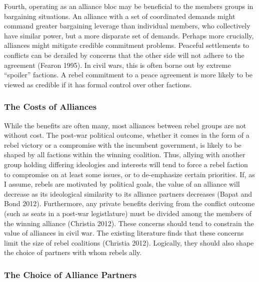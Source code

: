\documentclass[12pt,]{article}
\begin{document}
Fourth, operating as an alliance bloc may be beneficial to the members
groups in bargaining situations. An alliance with a set of coordinated
demands might command greater bargaining leverage than individual
members, who collectively have similar power, but a more disparate set
of demands. Perhaps more crucially, alliances might mitigate credible
commitment problems. Peaceful settlements to conflicts can be derailed
by concerns that the other side will not adhere to the agreement (Fearon
1995). In civil wars, this is often borne out by extreme ``spoiler''
factions. A rebel commitment to a peace agreement is more likely to be
viewed as credible if it has formal control over other factions.

\subsubsection{The Costs of Alliances}\label{the-costs-of-alliances}

While the benefits are often many, most alliances between rebel groups
are not without cost. The post-war political outcome, whether it comes
in the form of a rebel victory or a compromise with the incumbent
government, is likely to be shaped by all factions within the winning
coalition. Thus, allying with another group holding differing ideologies
and interests will tend to force a rebel faction to compromise on at
least some issues, or to de-emphasize certain priorities. If, as I
assume, rebels are motivated by political goals, the value of an
alliance will decrease as its ideological similarity to its alliance
partners decreases (Bapat and Bond 2012). Furthermore, any private
benefits deriving from the conflict outcome (such as seats in a post-war
legistlature) must be divided among the members of the winning alliance
(Christia 2012). These concerns should tend to constrain the value of
alliances in civil war. The existing literature finds that these
concerns limit the size of rebel coalitions (Christia 2012). Logically,
they should also shape the choice of partners with whom rebels ally.

\subsubsection{The Choice of Alliance
Partners}\label{the-choice-of-alliance-partners}
\end{document}
